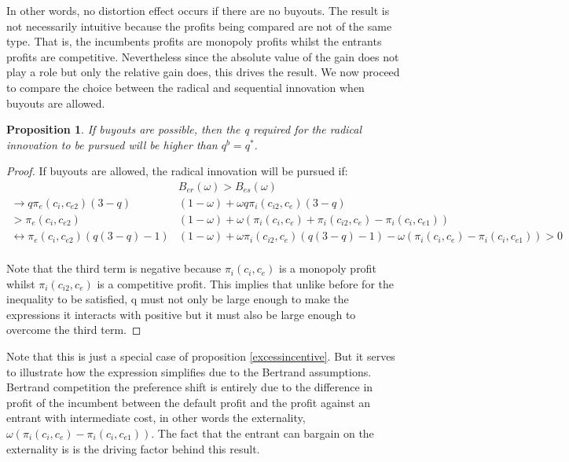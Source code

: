 \documentclass[12pt]{report}
\newtheorem{proposition}{Proposition}
\numberwithin{equation}{section}
\begin{document}
In other words, no distortion effect occurs if there are no buyouts. The result is not necessarily intuitive because the profits being compared are not of the same type. That is, the incumbents profits are monopoly profits whilst the entrants profits are competitive. Nevertheless since the absolute value of the gain does not play a role but only the relative gain does, this drives the result.
We now proceed to compare the choice between the radical and sequential innovation when buyouts are allowed.

\begin{proposition}
\label{higherq}
If buyouts are possible, then the q required for the radical innovation to be pursued will be higher than $q^b=q^*$. 
\end{proposition}

\begin{proof}
If buyouts are allowed, the radical innovation will be pursued if:
\begin{align*}
&B_{er}(\omega)>B_{es}(\omega) \\
\rightarrow q \pi_{e}(c_{i},c_{e2})(3-q)&(1-\omega)
+ \omega q 
\pi_{i}(c_{i2},c_{e}) (3-q) \\
> \pi_{e}(c_{i},c_{e2})&(1-\omega)+ \omega (\pi_{i}(c_{i},c_{e}) +  \pi_{i}(c_{i2},c_{e}) - \pi_{i}(c_{i},c_{e1}) ) \\
\leftrightarrow \pi_{e}(c_{i},c_{e2})(q(3-q)-1)&(1-\omega)
+ \omega \pi_{i}(c_{i2},c_{e}) (q(3-q)-1)-\omega(\pi_{i}(c_{i},c_{e})- \pi_{i}(c_{i},c_{e1})) 
> 0 \\
\end{align*}

Note that the third term is negative because $\pi_{i}(c_{i},c_{e})$ is a monopoly profit whilst  $\pi_{i}(c_{i2},c_{e})$ is a competitive profit. This implies that unlike before for the inequality to be satisfied, q must not only be large enough to make the expressions it interacts with positive but it must also be large enough to overcome the third term.
\end{proof}

Note that this is just a special case of proposition \ref{excessincentive}. But it serves to illustrate how the expression simplifies due to the Bertrand assumptions. Bertrand competition the preference shift is entirely due to the difference in profit of the incumbent between the default profit and the profit against an entrant with intermediate cost, in other words the externality,   $\omega(\pi_i(c_i,c_e)- \pi_i(c_i,c_{e1})) $. The fact that the entrant can bargain on the externality is is the driving factor behind this result. 
\end{document}
